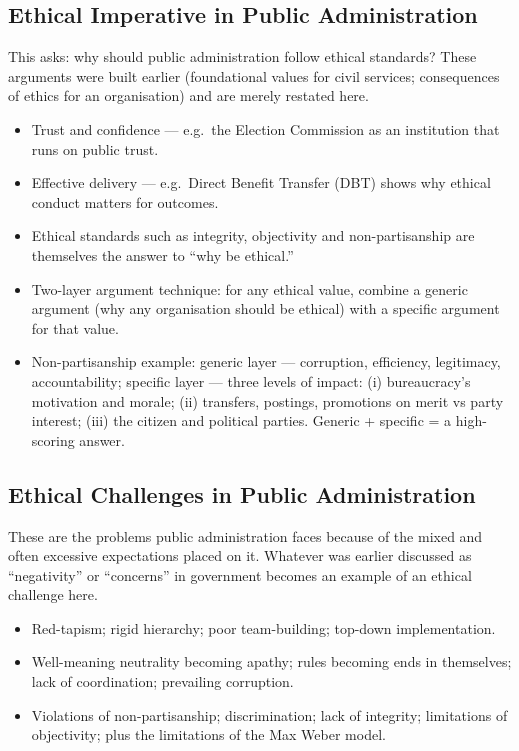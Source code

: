 \subsection{Ethical Imperative in Public Administration}
This asks: why should public administration follow ethical standards? These arguments were built earlier (foundational values for civil services; consequences of ethics for an organisation) and are merely restated here.
\begin{itemize}
\item Trust and confidence --- e.g.\ the Election Commission as an institution that runs on public trust.
\item Effective delivery --- e.g.\ Direct Benefit Transfer (DBT) shows why ethical conduct matters for outcomes.
\item Ethical standards such as integrity, objectivity and non-partisanship are themselves the answer to ``why be ethical.''
\end{itemize}

\begin{KeyConcept}
\begin{itemize}
\item Two-layer argument technique: for any ethical value, combine a generic argument (why any organisation should be ethical) with a specific argument for that value.
\item Non-partisanship example: generic layer --- corruption, efficiency, legitimacy, accountability; specific layer --- three levels of impact: (i) bureaucracy's motivation and morale; (ii) transfers, postings, promotions on merit vs party interest; (iii) the citizen and political parties. Generic + specific = a high-scoring answer.
\end{itemize}
\end{KeyConcept}

\subsection{Ethical Challenges in Public Administration}
These are the problems public administration faces because of the mixed and often excessive expectations placed on it. Whatever was earlier discussed as ``negativity'' or ``concerns'' in government becomes an example of an ethical challenge here.
\begin{itemize}
\item Red-tapism; rigid hierarchy; poor team-building; top-down implementation.
\item Well-meaning neutrality becoming apathy; rules becoming ends in themselves; lack of coordination; prevailing corruption.
\item Violations of non-partisanship; discrimination; lack of integrity; limitations of objectivity; plus the limitations of the Max Weber model.
\end{itemize}

